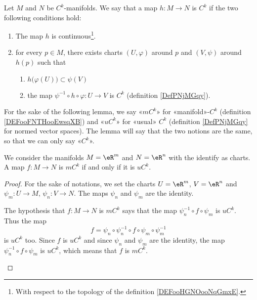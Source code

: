 \begin{definition}        \label{DEFooFNTHooEwsqXB}
	Let \( M\) and \( N\) be \( C^k\)-manifolds. We say that a map \( h\colon M\to N\) is \( C^k\) if the two following conditions hold:
	\begin{enumerate}
		\item
		      The map \( h\) is continuous\footnote{With respect to the topology of the definition \ref{DEFooHGNOooNqGmxE}.}.
		\item
		      for every \( p\in M\), there exists charts \( (U,\varphi)\) around \( p\) and \( (V,\psi)\) around \( h(p)\) such that
		      \begin{enumerate}
			      \item
			            \( h\big( \varphi(U) \big)\subset\psi(V)\)
			      \item       \label{SUBITEMooXQFUooRxMVnw}
			            the map \( \psi^{-1}\circ h\circ\varphi\colon U \to V \) is \( C^k\) (definition \ref{DefPNjMGqy}).
		      \end{enumerate}
	\end{enumerate}
\end{definition}

For the sake of the following lemma, we say «\( mC^k\)» for «manifold»-\( C^k\) (definition \ref{DEFooFNTHooEwsqXB}) and «\( uC^k\)» for «usual» \( C^k\) (definition \ref{DefPNjMGqy} for normed vector spaces). The lemma will say that the two notions are the same, so that we can only say «\( C^k\)».
\begin{lemma}
	We consider the manifolds \( M=\eR^m\) and \( N=\eR^n\) with the identify as charts. A map \( f\colon M\to N\) is \( mC^k\) if and only if it is \( uC^k\).
\end{lemma}

\begin{proof}
	For the sake of notations, we set the charts \( U=\eR^m\), \( V=\eR^n\) and \( \psi_m\colon U\to M\), \( \psi_n\colon V\to N\). The maps \( \psi_n\) and \( \psi_m\) are the identity.
	\begin{subproof}
		\spitem[\( \Rightarrow\)]
		The hypothesis that \( f\colon M\to N\) is \( mC^k\) says that the map \( \psi_n^{-1}\circ f\circ\psi_m\) is \( uC^k\). Thus the map
		\begin{equation}
			f=\psi_n\circ\psi_n^{-1}\circ f\circ\psi_m\circ\psi_m^{-1}
		\end{equation}
		is \( uC^k\) too.
		\spitem[\( \Leftarrow\)]
		Since \( f\) is \( uC^k\) and since \( \psi_n\) and \( \psi_m\) are the identity, the map \( \psi_n^{-1}\circ f\circ\psi_m\) is \( uC^k\), which means that \( f\) is \( mC^k\).
	\end{subproof}
\end{proof}


